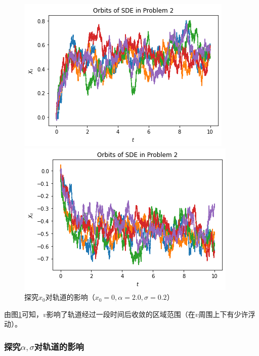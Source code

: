 \documentclass{article}
\begin{document}
\begin{figure}[H]
    \centering
    \begin{minipage}[c]{0.48\textwidth}
        \centering
        \includegraphics[height=0.2\textheight]{figures/SDE1 Orbit1.png}
    \end{minipage}
    \begin{minipage}[c]{0.48\textwidth}
        \centering
        \includegraphics[height=0.2\textheight]{figures/SDE1 Orbit3.png}
    \end{minipage}
    \caption{探究$x_0$对轨道的影响（$x_0 = 0, \alpha = 2.0, \sigma = 0.2$）}
    \label{fig:SDE1v}
\end{figure}

由图\ref{fig:SDE1v}可知，$v$影响了轨道经过一段时间后收敛的区域范围（在$v$周围上下有少许浮动）。

\subsubsection{探究$\alpha, \sigma$对轨道的影响}
\end{document}
